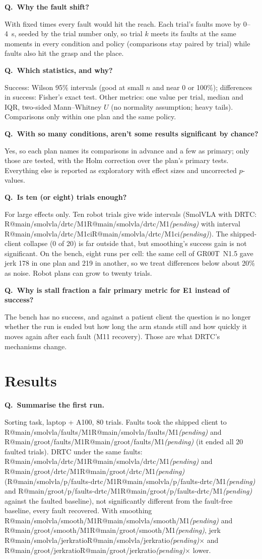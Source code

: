 \documentclass[11pt,a4paper]{article}
\makeatletter
\newcommand{\R}[1]{\ifcsname R@#1\endcsname\csname R@#1\endcsname\else\pending\fi}
\newcommand{\pending}{\textit{\color{warn}(pending)}}
\newcommand{\drtc}{DRTC}
\newcommand{\smolvla}{SmolVLA}
\newcommand{\groot}{GR00T~N1.5}
\newcounter{qn}
\newcommand{\q}[2]{\stepcounter{qn}\par\medskip
  {\bfseries\color{accent}Q\theqn.\ #1}\par\nopagebreak[4]#2\par}
\makeatother
\begin{document}
\q{Why the fault shift?}{With fixed times every fault would hit the reach. Each trial's faults move by 0--4~s, seeded
by the trial number only, so trial $k$ meets its faults at the same moments in every condition and policy (comparisons
stay paired by trial) while faults also hit the grasp and the place.}

\q{Which statistics, and why?}{Success: Wilson 95\% intervals (good at small $n$ and near 0 or 100\%); differences in
success: Fisher's exact test. Other metrics: one value per trial, median and IQR, two-sided Mann--Whitney $U$ (no
normality assumption; heavy tails). Comparisons only within one plan and the same policy.}

\q{With so many conditions, aren't some results significant by chance?}{Yes, so each plan names its comparisons in
advance and a few as primary; only those are tested, with the Holm correction over the plan's primary tests. Everything
else is reported as exploratory with effect sizes and uncorrected $p$-values.}

\q{Is ten (or eight) trials enough?}{For large effects only. Ten robot trials give wide intervals (\smolvla{} with
\drtc: \R{main/smolvla/drtc/M1} with interval \R{main/smolvla/drtc/M1ci}). The shipped-client collapse (0 of 20) is
far outside that, but smoothing's success gain is not significant. On the bench, eight runs per cell: the same cell of
\groot{} gave jerk 178 in one plan and 219 in another, so we treat differences below about 20\% as noise. Robot plans
can grow to twenty trials.}

\q{Why is stall fraction a fair primary metric for E1 instead of success?}{The bench has no success, and against a
patient client the question is no longer whether the run is ended but how long the arm stands still and how quickly
it moves again after each fault (M11 recovery). Those are what \drtc's mechanisms change.}

\section{Results}

\q{Summarise the first run.}{Sorting task, laptop + A100, 80 trials. Faults took the shipped client to
\R{main/smolvla/faults/M1} and \R{main/groot/faults/M1} (it ended all 20 faulted trials). \drtc{} under the same faults:
\R{main/smolvla/drtc/M1} and \R{main/groot/drtc/M1} (\R{main/smolvla/p/faults-drtc/M1} and
\R{main/groot/p/faults-drtc/M1} against the faulted baseline), not significantly different from the fault-free
baseline, every fault recovered. With smoothing \R{main/smolvla/smooth/M1} and \R{main/groot/smooth/M1}, jerk
\R{main/smolvla/jerkratio}$\times$ and \R{main/groot/jerkratio}$\times$ lower.}
\end{document}
